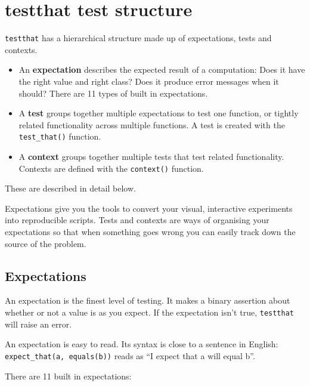 \section{testthat test structure}

\texttt{testthat} has a hierarchical structure made up of expectations,
tests and contexts.

\begin{itemize}
\item
  An \textbf{expectation} describes the expected result of a
  computation: Does it have the right value and right class? Does it
  produce error messages when it should? There are 11 types of built in
  expectations.
\item
  A \textbf{test} groups together multiple expectations to test one
  function, or tightly related functionality across multiple functions.
  A test is created with the \texttt{test\_that()} function.
\item
  A \textbf{context} groups together multiple tests that test related
  functionality. Contexts are defined with the \texttt{context()}
  function.
\end{itemize}

These are described in detail below.

Expectations give you the tools to convert your visual, interactive
experiments into reproducible scripts. Tests and contexts are ways of
organising your expectations so that when something goes wrong you can
easily track down the source of the problem.

\subsection{Expectations}

An expectation is the finest level of testing. It makes a binary
assertion about whether or not a value is as you expect. If the
expectation isn't true, \texttt{testthat} will raise an error.

An expectation is easy to read. Its syntax is close to a sentence in
English: \texttt{expect\_that(a, equals(b))} reads as ``I expect that a
will equal b''.

There are 11 built in expectations:

